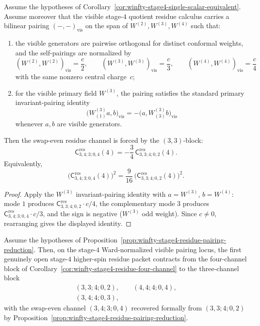 \begin{proposition}
\label{prop:winfty-stage4-residue-pairing-reduction}
Assume the hypotheses of
Corollary~\ref{cor:winfty-stage4-single-scalar-equivalent}.  Assume
moreover that the visible stage-$4$ quotient residue calculus carries a
bilinear pairing \((-, -)_{\mathrm{vis}}\) on the span of
\(W^{(2)},W^{(3)},W^{(4)}\) such that:
\begin{enumerate}[label=\textup{(\roman*)}]
\item the visible generators are pairwise orthogonal for distinct
  conformal weights, and the self-pairings are normalized by
  \[
  (W^{(2)},W^{(2)})_{\mathrm{vis}}=\frac{c}{2},\qquad
  (W^{(3)},W^{(3)})_{\mathrm{vis}}=\frac{c}{3},\qquad
  (W^{(4)},W^{(4)})_{\mathrm{vis}}=\frac{c}{4}
  \]
  with the same nonzero central charge~\(c\);
\item for the visible primary field \(W^{(3)}\), the pairing satisfies
  the standard primary invariant-pairing identity
  \[
  \bigl(W^{(3)}_{(1)}a,b\bigr)_{\mathrm{vis}}
  =
  -\bigl(a,W^{(3)}_{(3)}b\bigr)_{\mathrm{vis}}
  \]
  whenever \(a,b\) are visible generators.
\end{enumerate}
Then the swap-even residue channel is forced by the \((3,3)\)-block:
\[
\mathsf{C}^{\mathrm{res}}_{3,4;3;0,4}(4)
=
-\frac{3}{4}\,
\mathsf{C}^{\mathrm{res}}_{3,3;4;0,2}(4).
\]
Equivalently,
\[
\bigl(\mathsf{C}^{\mathrm{res}}_{3,4;3;0,4}(4)\bigr)^2
=
\frac{9}{16}\,
\bigl(\mathsf{C}^{\mathrm{res}}_{3,3;4;0,2}(4)\bigr)^2.
\]
\end{proposition}

\begin{proof}
Apply the $W^{(3)}$ invariant-pairing identity with $a=W^{(3)}$, $b=W^{(4)}$: mode $1$ produces $\mathsf{C}^{\mathrm{res}}_{3,3;4;0,2}\cdot c/4$, the complementary mode $3$ produces $\mathsf{C}^{\mathrm{res}}_{3,4;3;0,4}\cdot c/3$, and the sign is negative ($W^{(3)}$ odd weight).  Since $c\neq 0$, rearranging gives the displayed identity.
\end{proof}

\begin{corollary}
\label{cor:winfty-stage4-residue-three-channel}
Assume the hypotheses of
Proposition~\ref{prop:winfty-stage4-residue-pairing-reduction}.  Then,
on the stage-$4$ Ward-normalized visible pairing locus, the first
genuinely open stage-$4$ higher-spin residue packet contracts from the
four-channel block of
Corollary~\ref{cor:winfty-stage4-residue-four-channel} to the
three-channel block
\[
\begin{gathered}
(3,3;4;0,2),\qquad
(4,4;4;0,4),\\
(3,4;4;0,3),
\end{gathered}
\]
with the swap-even channel \((3,4;3;0,4)\) recovered formally from
\((3,3;4;0,2)\) by
Proposition~\ref{prop:winfty-stage4-residue-pairing-reduction}.
\end{corollary}

